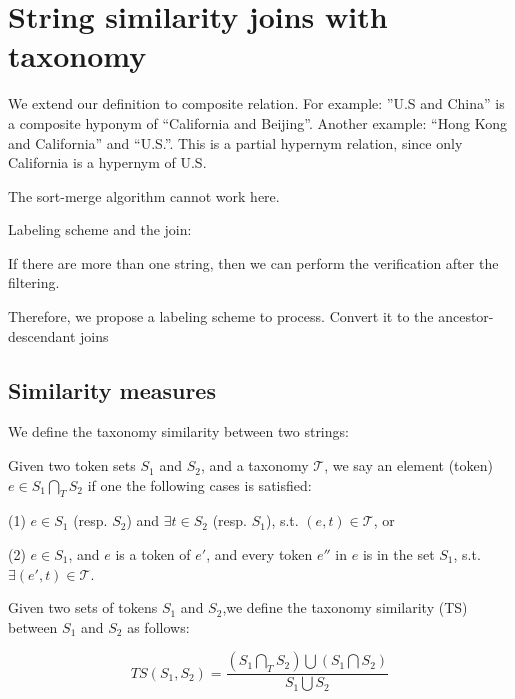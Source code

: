 
\section{String similarity joins with taxonomy}


We extend our definition to composite relation. For example: ''U.S and China'' is a composite hyponym of ``California and Beijing''. Another example: ``Hong Kong and California'' and ``U.S.''. This is a partial hypernym relation, since only California is a hypernym of U.S.

The sort-merge algorithm cannot work here.

Labeling scheme and the join:

If there are more than one string, then we can perform the verification after the filtering.


 Therefore, we propose a labeling scheme to process. Convert it to the ancestor-descendant joins



\subsection{Similarity measures}



We define the taxonomy similarity between two strings:

\begin{definition}
Given two token sets $S_1$ and $S_2$, and a taxonomy $\mathcal{T}$, we say an element (token) $e \in S_1 \bigcap_T S_2$ if one the following cases is satisfied:

(1) $ e \in S_1$ (resp. $S_2$) and $\exists t \in S_2$ (resp. $S_1$), s.t. $(e,t) \in \mathcal{T} $, or

(2) $ e \in S_1$, and $e$ is a token of $e'$, and every token $e''$ in $e$ is in the set $S_1$, s.t. $\exists (e',t) \in \mathcal{T}$.\end{definition}

\begin{definition}   Given two sets of tokens $S_1$ and $S_2$,we define the taxonomy similarity (TS) between $S_1$ and $S_2$ as follows:

\begin{equation}
TS(S_1,S_2)=  \frac{(S_1 \bigcap_T S_2) \bigcup (S_1 \bigcap S_2) }{S_1 \bigcup S_2}
\end{equation} \end{definition}

